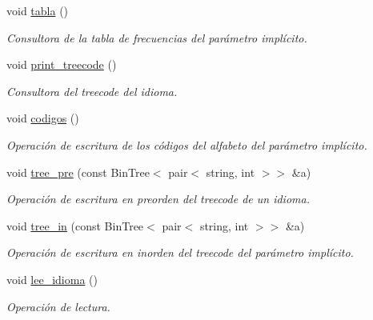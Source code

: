 \begin{DoxyCompactItemize}
void \hyperlink{class_idioma_a862b9fe26b8929a7d6b4af8a1373d0a0}{tabla} ()
\begin{DoxyCompactList}\small\item\em Consultora de la tabla de frecuencias del parámetro implícito. \end{DoxyCompactList}\item 
void \hyperlink{class_idioma_a62777b96c5fcdbcf3fa9a5ebafe45988}{print\+\_\+treecode} ()
\begin{DoxyCompactList}\small\item\em Consultora del treecode del idioma. \end{DoxyCompactList}\item 
void \hyperlink{class_idioma_a2b615f7b30362bfc20e6319835017031}{codigos} ()
\begin{DoxyCompactList}\small\item\em Operación de escritura de los códigos del alfabeto del parámetro implícito. \end{DoxyCompactList}\item 
void \hyperlink{class_idioma_aaf85e226b876366ea2cb1ebf5cf04388}{tree\+\_\+pre} (const Bin\+Tree$<$ pair$<$ string, int $>$$>$ \&a)
\begin{DoxyCompactList}\small\item\em Operación de escritura en preorden del treecode de un idioma. \end{DoxyCompactList}\item 
void \hyperlink{class_idioma_a1fdf7b5bae642b911ab51b100f56e55f}{tree\+\_\+in} (const Bin\+Tree$<$ pair$<$ string, int $>$$>$ \&a)
\begin{DoxyCompactList}\small\item\em Operación de escritura en inorden del treecode del parámetro implícito. \end{DoxyCompactList}\item 
void \hyperlink{class_idioma_a0a4599da90aef15aa798a63ee6ad820e}{lee\+\_\+idioma} ()
\begin{DoxyCompactList}\small\item\em Operación de lectura. \end{DoxyCompactList}\end{DoxyCompactItemize}
